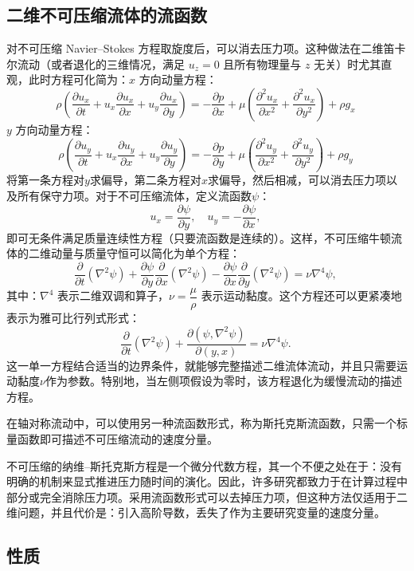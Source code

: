 \subsection{二维不可压缩流体的流函数}
对不可压缩 Navier–Stokes 方程取旋度后，可以消去压力项。这种做法在二维笛卡尔流动（或者退化的三维情况，满足 $u_z = 0$ 且所有物理量与 $z$ 无关）时尤其直观，此时方程可化简为：$x$ 方向动量方程：
$$
\rho 
\left(
\frac{\partial u_x}{\partial t}
+ u_x \frac{\partial u_x}{\partial x}
+ u_y \frac{\partial u_x}{\partial y}
\right)
= 
-\frac{\partial p}{\partial x}
+ \mu
\left(
\frac{\partial^2 u_x}{\partial x^2}
+ \frac{\partial^2 u_x}{\partial y^2}
\right)
+ \rho g_x~
$$
$y$ 方向动量方程：
$$
\rho 
\left(
\frac{\partial u_y}{\partial t}
+ u_x \frac{\partial u_y}{\partial x}
+ u_y \frac{\partial u_y}{\partial y}
\right)
= 
-\frac{\partial p}{\partial y}
+ \mu
\left(
\frac{\partial^2 u_y}{\partial x^2}
+ \frac{\partial^2 u_y}{\partial y^2}
\right)
+ \rho g_y~
$$
将第一条方程对$y$求偏导，第二条方程对$x$求偏导，然后相减，可以消去压力项以及所有保守力项。对于不可压缩流体，定义流函数$\psi$：
$$
u_x = \frac{\partial \psi}{\partial y}, 
\quad 
u_y = -\frac{\partial \psi}{\partial x},~
$$
即可无条件满足质量连续性方程（只要流函数是连续的）。这样，不可压缩牛顿流体的二维动量与质量守恒可以简化为单个方程：
$$
\frac{\partial}{\partial t}\left(\nabla^2 \psi\right)
+ \frac{\partial \psi}{\partial y} 
  \frac{\partial}{\partial x} \left(\nabla^2 \psi\right)
- \frac{\partial \psi}{\partial x} 
  \frac{\partial}{\partial y} \left(\nabla^2 \psi\right)
= \nu \nabla^4 \psi,~
$$
其中：$\nabla^4$ 表示二维双调和算子，$\nu = \dfrac{\mu}{\rho}$ 表示运动黏度。这个方程还可以更紧凑地表示为雅可比行列式形式：
$$
\frac{\partial}{\partial t}\left(\nabla^2 \psi\right)
+ 
\frac{\partial(\psi, \nabla^2 \psi)}{\partial (y, x)}
= 
\nu \nabla^4 \psi.~
$$
这一单一方程结合适当的边界条件，就能够完整描述二维流体流动，并且只需要运动黏度$\nu$作为参数。特别地，当左侧项假设为零时，该方程退化为缓慢流动的描述方程。

在轴对称流动中，可以使用另一种流函数形式，称为斯托克斯流函数，只需一个标量函数即可描述不可压缩流动的速度分量。

不可压缩的纳维–斯托克斯方程是一个微分代数方程，其一个不便之处在于：没有明确的机制来显式推进压力随时间的演化。因此，许多研究都致力于在计算过程中部分或完全消除压力项。采用流函数形式可以去掉压力项，但这种方法仅适用于二维问题，并且代价是：引入高阶导数，丢失了作为主要研究变量的速度分量。
\subsection{性质}
